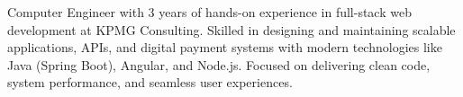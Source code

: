 
\begin{cvparagraph}
Computer Engineer with 3 years of hands-on experience in full-stack web development at KPMG Consulting.
Skilled in designing and maintaining scalable applications, APIs, and digital payment systems with modern technologies like Java (Spring Boot), Angular, and Node.js.
Focused on delivering clean code, system performance, and seamless user experiences.
\end{cvparagraph}

